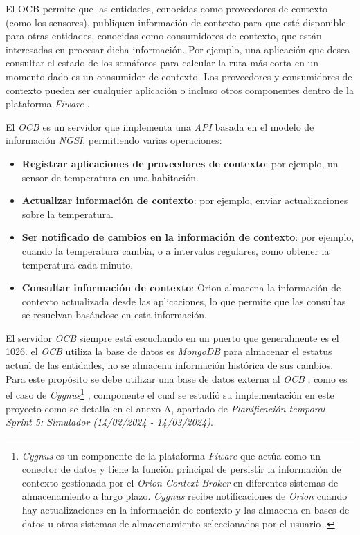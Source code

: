 El OCB permite que las entidades, conocidas como proveedores de contexto (como los sensores), publiquen información de contexto para que esté disponible para otras entidades, conocidas como consumidores de contexto, que están interesadas en procesar dicha información. Por ejemplo, una aplicación que desea consultar el estado de los semáforos para calcular la ruta más corta en un momento dado es un consumidor de contexto. Los proveedores y consumidores de contexto pueden ser cualquier aplicación o incluso otros componentes dentro de la plataforma \textit{Fiware} \cite{FIWARE-Orion}.

El \textit{OCB} es un servidor que implementa una \textit{API} basada en el modelo de información \textit{NGSI}, permitiendo varias operaciones:

\begin{itemize}
    \item \textbf{Registrar aplicaciones de proveedores de contexto}: por ejemplo, un sensor de temperatura en una habitación.
    \item \textbf{Actualizar información de contexto}: por ejemplo, enviar actualizaciones sobre la temperatura.
    \item \textbf{Ser notificado de cambios en la información de contexto}: por ejemplo, cuando la temperatura cambia, o a intervalos regulares, como obtener la temperatura cada minuto.
    \item \textbf{Consultar información de contexto}: Orion almacena la información de contexto actualizada desde las aplicaciones, lo que permite que las consultas se resuelvan basándose en esta información.
\end{itemize}

El servidor \textit{OCB} siempre está escuchando en un puerto que generalmente es el 1026. el \textit{OCB} utiliza la base de datos es \textit{MongoDB} para almacenar el estatus actual de las entidades, no se almacena información histórica de sus cambios. Para este propósito se debe utilizar una base de datos externa al \textit{OCB} \cite{orion}, como es el caso de \textit{Cygnus}\footnote{\textit{Cygnus} es un componente de la plataforma \textit{Fiware} que actúa como un conector de datos y tiene la función principal de persistir la información de contexto gestionada por el \textit{Orion Context Broker} en diferentes sistemas de almacenamiento a largo plazo. \textit{Cygnus} recibe notificaciones de \textit{Orion} cuando hay actualizaciones en la información de contexto y las almacena en bases de datos u otros sistemas de almacenamiento seleccionados por el usuario \cite{fiware_cygnus}.} , componente el cual se estudió su implementación en este proyecto como se detalla en el anexo A, apartado de \textit{Planificación temporal} \textit{Sprint 5: Simulador (14/02/2024 - 14/03/2024)}.

